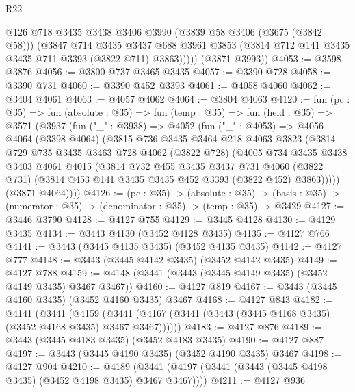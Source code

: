 \begin{lexlean}{R22}
\begin{coremodule}
            @126
            @718
            @3435
            @3438
            @3406
            @3990
            (@3839 @58 @3406 (@3675 (@3842 @58)))
            (@3847
              @714
              @3435
              @3437
              @688
              @3961
              @3853
              (@3814 @712 @141 @3435 @3435 @711 @3393 (@3822 @711) @3863)))))
      (@3871 @3993))
@4053 := @3598 @3876
@4056 := @3800 @737 @3465 @3435
@4057 := @3390 @728
@4058 := @3390 @731
@4060 := @3390 @452 @3393
@4061 := @4058 @4060
@4062 := @3404 @4061
@4063 := @4057 @4062
@4064 := @3804 @4063
@4120 := fun (pc : @35) =>
  fun (absolute : @35) =>
  fun (temp : @35) =>
  fun (held : @35) =>
  @3571
    (@3937
      (fun ("_" : @3938) =>
      @4052
        (fun ("_" : @4053) =>
        @4056
          @4064
          (@3398 @4064)
          (@3815
            @736
            @3435
            @3464
            @218
            @4063
            @3823
            (@3814
              @729
              @735
              @3435
              @3463
              @728
              @4062
              (@3822 @728)
              (@4005
                @734
                @3435
                @3438
                @3403
                @4061
                @4015
                (@3814
                  @732
                  @455
                  @3435
                  @3437
                  @731
                  @4060
                  (@3822 @731)
                  (@3814 @453 @141 @3435 @3435 @452 @3393 (@3822 @452) @3863)))))
          (@3871 @4064))))
@4126 := (pc : @35) ->
  (absolute : @35) ->
  (basis : @35) -> (numerator : @35) -> (denominator : @35) -> (temp : @35) -> @3429
@4127 := @3446 @3790
@4128 := @4127 @755
@4129 := @3445 @4128
@4130 := @4129 @3435
@4134 := @3443 @4130 (@3452 @4128 @3435)
@4135 := @4127 @766
@4141 := @3443 (@3445 @4135 @3435) (@3452 @4135 @3435)
@4142 := @4127 @777
@4148 := @3443 (@3445 @4142 @3435) (@3452 @4142 @3435)
@4149 := @4127 @788
@4159 := @4148 (@3441 (@3443 (@3445 @4149 @3435) (@3452 @4149 @3435) @3467 @3467))
@4160 := @4127 @819
@4167 := @3443 (@3445 @4160 @3435) (@3452 @4160 @3435) @3467
@4168 := @4127 @843
@4182 := @4141
    (@3441
      (@4159 (@3441 (@4167 (@3441 (@3443 (@3445 @4168 @3435) (@3452 @4168 @3435) @3467 @3467))))))
@4183 := @4127 @876
@4189 := @3443 (@3445 @4183 @3435) (@3452 @4183 @3435)
@4190 := @4127 @887
@4197 := @3443 (@3445 @4190 @3435) (@3452 @4190 @3435) @3467
@4198 := @4127 @904
@4210 := @4189 (@3441 (@4197 (@3441 (@3443 (@3445 @4198 @3435) (@3452 @4198 @3435) @3467 @3467))))
@4211 := @4127 @936

\end{coremodule}
\end{lexlean}
